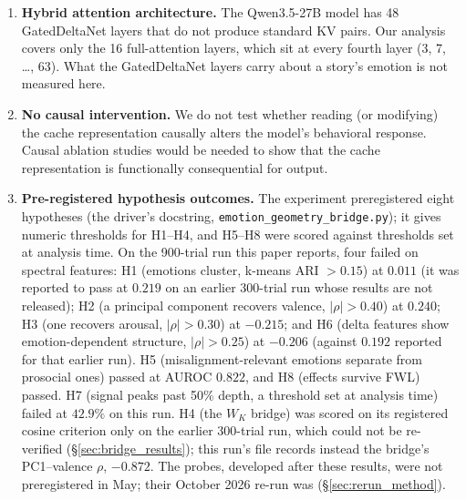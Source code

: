 \begin{enumerate}[nosep]
    \item \textbf{Hybrid attention architecture.} The Qwen3.5-27B model has 48 GatedDeltaNet layers that do not produce standard KV pairs. Our analysis covers only the 16 full-attention layers, which sit at every fourth layer (3, 7, \ldots, 63). What the GatedDeltaNet layers carry about a story's emotion is not measured here.

    \item \textbf{No causal intervention.} We do not test whether reading (or modifying) the cache representation causally alters the model's behavioral response. Causal ablation studies would be needed to show that the cache representation is functionally consequential for output.

    \item \textbf{Pre-registered hypothesis outcomes.} The experiment preregistered eight hypotheses (the driver's docstring, \texttt{emotion\_geometry\_bridge.py}); it gives numeric thresholds for H1--H4, and H5--H8 were scored against thresholds set at analysis time. On the 900-trial run this paper reports, four failed on spectral features: H1 (emotions cluster, k-means ARI $> 0.15$) at $0.011$ (it was reported to pass at $0.219$ on an earlier 300-trial run whose results are not released); H2 (a principal component recovers valence, $|\rho| > 0.40$) at $0.240$; H3 (one recovers arousal, $|\rho| > 0.30$) at $-0.215$; and H6 (delta features show emotion-dependent structure, $|\rho| > 0.25$) at $-0.206$ (against $0.192$ reported for that earlier run). H5 (misalignment-relevant emotions separate from prosocial ones) passed at AUROC $0.822$, and H8 (effects survive FWL) passed. H7 (signal peaks past 50\% depth, a threshold set at analysis time) failed at $42.9\%$ on this run. H4 (the $W_K$ bridge) was scored on its registered cosine criterion only on the earlier 300-trial run, which could not be re-verified (\S\ref{sec:bridge_results}); this run's file records instead the bridge's PC1--valence $\rho$, $-0.872$. The probes, developed after these results, were not preregistered in May; their October 2026 re-run was (\S\ref{sec:rerun_method}).

\end{enumerate}

